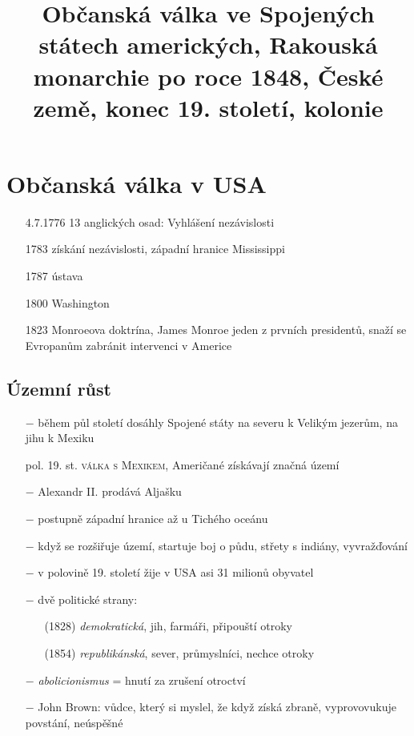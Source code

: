 \documentclass{article}
\title{\vspace{-2cm}Občanská válka ve Spojených státech amerických, Rakouská monarchie po roce 1848, České země, konec 19. století, kolonie \vspace{-1.7cm}}
\date{}
\author{}
\begin{document}
\maketitle

\section*{Občanská válka v USA}
\begin{itemize}
    \vspace{-0.5em}
    \setlength\itemsep{0.15em}
    \item[4.7.1776] 13 anglických osad: Vyhlášení nezávislosti
    \item[1783] získání nezávislosti, západní hranice Mississippi
    \item[1787] ústava
    \item[1800] Washington
    \item[1823] Monroeova doktrína, James Monroe jeden z prvních presidentů, snaží se Evropanům zabránit intervenci v Americe
\end{itemize}

\subsection*{Územní růst}
\begin{itemize}
    \vspace{-0.5em}
    \setlength\itemsep{0.15em}
    \item[$-$] během půl století dosáhly Spojené státy na severu k Velikým jezerům, na jihu k Mexiku
    \item[pol. 19. st.] \textsc{válka s Mexikem}, Američané získávají značná území
    \item[$-$] Alexandr II. prodává Aljašku
    \item[$-$] postupně západní hranice až u Tichého oceánu
    \item[$-$] když se rozšiřuje území, startuje boj o půdu, střety s indiány, vyvražďování
    \item[$-$] v polovině 19. století žije v USA asi 31 milionů obyvatel
    \item[$-$] dvě politické strany:
    \begin{itemize}
        \vspace{-0.5em}
        \setlength\itemsep{0.15em}
        \item[(1828)] \textit{demokratická}, jih, farmáři, připouští otroky
        \item[(1854)] \textit{republikánská}, sever, průmyslníci, nechce otroky
    \end{itemize}
    \item[$-$] \textit{abolicionismus} = hnutí za zrušení otroctví
    \item[$-$] John Brown: vůdce, který si myslel, že když získá zbraně, vyprovovukuje povstání, neúspěšné
\end{itemize}
\end{document}
